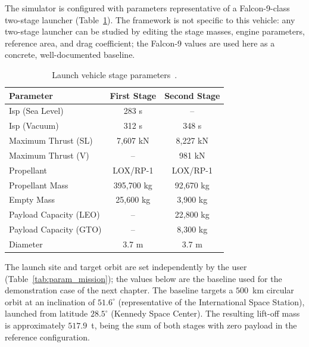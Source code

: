 The simulator is configured with parameters representative of a Falcon-9-class
two-stage launcher (Table~\ref{tab:stage_params}). The framework is not specific
to this vehicle: any two-stage launcher can be studied by editing the stage
masses, engine parameters, reference area, and drag coefficient; the Falcon-9
values are used here as a concrete, well-documented baseline.

\begin{table}[ht]
\centering
\caption{Launch vehicle stage parameters~\cite{NASA_Falcon9v12_Datasheet_2018,
SpaceX_Falcon9_2025, Wevolver_Falcon9v12_Block5_2019}.}
\label{tab:stage_params}
\begin{tabular}{lcc}
\hline
\textbf{Parameter} & \textbf{First Stage} & \textbf{Second Stage} \\
\hline
Isp (Sea Level)          & 283 s        & --       \\
Isp (Vacuum)             & 312 s        & 348 s    \\
Maximum Thrust (SL)      & 7{,}607 kN    & 8{,}227 kN \\
Maximum Thrust (V)       & --           & 981 kN   \\
Propellant               & LOX/RP-1      & LOX/RP-1 \\
Propellant Mass          & 395{,}700 kg  & 92{,}670 kg \\
Empty Mass               & 25{,}600 kg   & 3{,}900 kg \\
Payload Capacity (LEO)   & --           & 22{,}800 kg \\
Payload Capacity (GTO)   & --           & 8{,}300 kg \\
Diameter                 & 3.7 m        & 3.7 m    \\
\hline
\end{tabular}
\end{table}

The launch site and target orbit are set independently by the user
(Table~\ref{tab:param_mission}); the values below are the baseline used for the
demonstration case of the next chapter. The baseline targets a $500$~km circular
orbit at an inclination of $51.6^\circ$ (representative of the International Space
Station), launched from latitude $28.5^\circ$ (Kennedy Space Center). The
resulting lift-off mass is approximately $517.9$~t, being the sum of both stages
with zero payload in the reference configuration.

